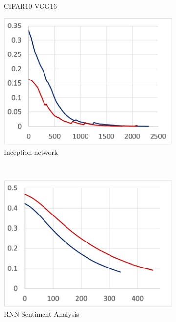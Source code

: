 \begin{figure}[!ht]
\begin{subfigure}[t]{.24\textwidth}
    \caption{CIFAR10-VGG16}
  \end{subfigure}
  \par\bigskip
  \begin{subfigure}[t]{.24\textwidth}
    \includegraphics[width=\textwidth]{tf2-07}
    \caption{Inception-network}
  \end{subfigure}
  ~
  \begin{subfigure}[t]{.24\textwidth}
    \includegraphics[width=\textwidth]{tf2-09}
    \caption{RNN-Sentiment-Analysis}
  \end{subfigure} 
  ~ 
  \begin{subfigure}[t]{.24\textwidth}

\end{subfigure}
\end{figure}
